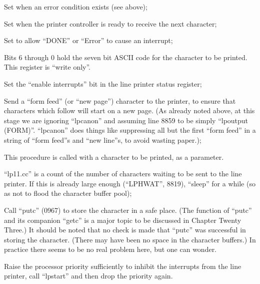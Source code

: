 
\bd
\item[bit 15] Set when an error condition
exists (see above);

\item[bit 7 ``DONE''] Set when the printer
controller is ready to receive the next character;

\item[bit 6 ``IENABLE''] Set to allow ``DONE'' or ``Error''
to cause an interrupt;
\ed


Bits 6 through 0 hold the seven bit
ASCII code for the character to be
printed. This register is ``write only''.

\bd
\item[8858:] Set the ``enable interrupts'' bit
in the line printer status register;

\item[8859:] Send a ``form feed'' (or ``new
page'') character to the printer,
to ensure that characters which
follow will start on a new page.
(As already noted above, at this
stage we are ignoring ``lpcanon''
and assuming line 8859 to be simply ``lpoutput (FORM)''. ``lpcanon''
does things like suppressing all
but the first ``form feed'' in a
string of ``form feed''s and ``new
line''s, to avoid wasting paper.);
\ed


This procedure is called with a character to be printed, as a parameter.

\bd
\item[8988:] ``lp11.cc'' is a count of the 
number of characters waiting to be sent to the line
printer. If this is already large enough
(``LPHWAT'', 8819), ``sleep'' for a
while (so as not to flood the
character buffer pool);

\item[8990:] Call ``putc'' (0967) to store the
character in a safe place. (The
function of ``putc'' and its companion ``getc'' is a major topic to
be discussed in Chapter Twenty Three.) It should be noted that
no check is made that ``putc'' was
successful in storing the character. (There may have been no
space in the character buffers.)
In practice there seems to be no
real problem here, but one can
wonder.

\item[8991:] Raise the processor priority
sufficiently to inhibit the interrupts from the line printer, call
``lpstart'' and then drop the
priority again.
\ed


